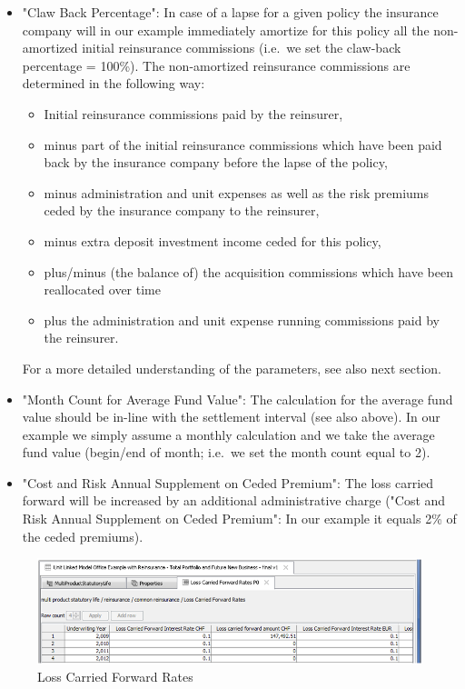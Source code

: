 \begin{itemize}
	\item"Claw Back Percentage": In case of a lapse for a given policy the insurance company will in our example immediately amortize for this policy all the non-amortized initial reinsurance commissions (i.e.~we set the claw-back percentage = 100\%). The non-amortized reinsurance commissions are determined in the following way:
		\begin{itemize}
		\item Initial reinsurance commissions paid by the reinsurer,
			\item minus part of the initial reinsurance commissions which have been paid back by the insurance company before the lapse of the policy,
			\item	minus administration and unit expenses as well as the risk premiums ceded by the insurance company to the reinsurer,
			\item	minus extra deposit investment income ceded for this policy,
			\item	plus/minus (the balance of) the acquisition commissions which have been reallocated over time
			\item	plus the administration and unit expense running commissions paid by the reinsurer. 
		\end{itemize}
For a more detailed understanding of the parameters, see also next section.
	\item"Month Count for Average Fund Value": The calculation for the average fund value should be in-line with the settlement interval (see also above). In our example we simply assume a monthly calculation and we take the average fund value (begin/end of month; i.e.~we set the month count equal to 2).
	\item"Cost and Risk Annual Supplement on Ceded Premium": The loss carried forward will be increased by an additional administrative charge ("Cost and Risk Annual Supplement on Ceded Premium": In our example it equals 2\% of the ceded premiums).
	
\end{itemize}

\begin{figure}
\includegraphics[scale=0.7]{images/mdplosscarriedfwrates.png}
	\caption{Loss Carried Forward Rates}
	\label{fig:mdplosscarriedfwrates}
\end{figure}

